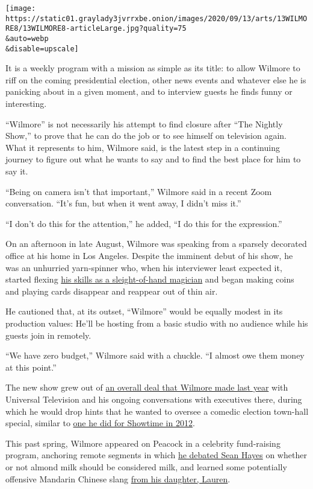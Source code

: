 \texttt{[image: https://static01.graylady3jvrrxbe.onion/images/2020/09/13/arts/13WILMORE8/13WILMORE8-articleLarge.jpg?quality=75\\\&auto=webp\\\&disable=upscale]}

It is a weekly program with a mission as simple as its title: to allow
Wilmore to riff on the coming presidential election, other news events
and whatever else he is panicking about in a given moment, and to
interview guests he finds funny or interesting.

``Wilmore'' is not necessarily his attempt to find closure after ``The
Nightly Show,'' to prove that he can do the job or to see himself on
television again. What it represents to him, Wilmore said, is the latest
step in a continuing journey to figure out what he wants to say and to
find the best place for him to say it.

``Being on camera isn't that important,'' Wilmore said in a recent Zoom
conversation. ``It's fun, but when it went away, I didn't miss it.''

``I don't do this for the attention,'' he added, ``I do this for the
expression.''

On an afternoon in late August, Wilmore was speaking from a sparsely
decorated office at his home in Los Angeles. Despite the imminent debut
of his show, he was an unhurried yarn-spinner who, when his interviewer
least expected it, started flexing
\href{https://www.youtube.com/watch?v=dhj5rZk9tmg\&t=4m29s}{his skills
as a sleight-of-hand magician} and began making coins and playing cards
disappear and reappear out of thin air.

He cautioned that, at its outset, ``Wilmore'' would be equally modest in
its production values: He'll be hosting from a basic studio with no
audience while his guests join in remotely.

``We have zero budget,'' Wilmore said with a chuckle. ``I almost owe
them money at this point.''

The new show grew out of
\href{https://deadline.com/2019/05/larry-wilmore-overall-deal-universal-television-1202624582/}{an
overall deal that Wilmore made last year} with Universal Television and
his ongoing conversations with executives there, during which he would
drop hints that he wanted to oversee a comedic election town-hall
special, similar to
\href{https://www.sho.com/video/17698/behind-the-scenes-larry-wilmore}{one
he did for Showtime in 2012}.

This past spring, Wilmore appeared on Peacock in a celebrity
fund-raising program, anchoring remote segments in which
\href{https://www.youtube.com/watch?v=dhj5rZk9tmg\&t=1m36s}{he debated
Sean Hayes} on whether or not almond milk should be considered milk, and
learned some potentially offensive Mandarin Chinese slang
\href{https://www.youtube.com/watch?v=dhj5rZk9tmg\&t=3m00s}{from his
daughter, Lauren}.

